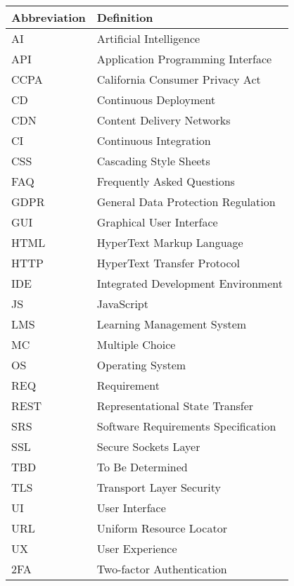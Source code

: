 \documentclass[a4paper, 11pt]{scrreprt}
\begin{document}
\begin{center}
    \begin{tabularx}{\textwidth}{lX}
        \toprule
        \textbf{Abbreviation} & \textbf{Definition} \\
        \midrule
        AI & Artificial Intelligence \\
        API & Application Programming Interface \\
        CCPA & California Consumer Privacy Act \\
        CD & Continuous Deployment \\
        CDN & Content Delivery Networks \\
        CI & Continuous Integration \\
        CSS & Cascading Style Sheets \\
        FAQ & Frequently Asked Questions \\
        GDPR & General Data Protection Regulation \\
        GUI & Graphical User Interface \\
        HTML & HyperText Markup Language \\
        HTTP & HyperText Transfer Protocol \\
        IDE & Integrated Development Environment \\
        JS & JavaScript \\
        LMS & Learning Management System \\
        MC & Multiple Choice \\
        OS & Operating System \\
        REQ & Requirement \\
        REST & Representational State Transfer \\
        SRS & Software Requirements Specification \\
        SSL & Secure Sockets Layer \\
        TBD & To Be Determined \\
        TLS & Transport Layer Security \\
        UI & User Interface \\
        URL & Uniform Resource Locator \\
        UX & User Experience \\
        2FA & Two-factor Authentication \\
        \bottomrule
    \end{tabularx}
\end{center}
\end{document}
